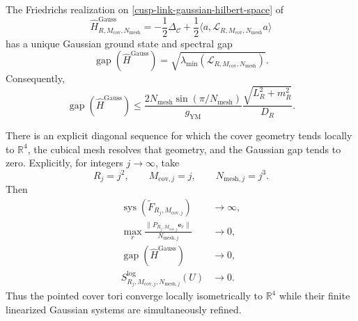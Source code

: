 \begin{theorem}
\label{cusp-link-gaussian-theorem}
The Friedrichs realization on \eqref{cusp-link-gaussian-hilbert-space} of
\begin{equation}
 \widehat H^{\mathrm{Gauss}}_{R,M_{\mathrm{cov}},N_{\mathrm{mesh}}}
 =-\frac12\Delta_{\mathscr C}
  +\frac12\langle a,
     \mathcal L_{R,M_{\mathrm{cov}},N_{\mathrm{mesh}}}a\rangle
 \label{cusp-link-gaussian-hamiltonian}
\end{equation}
has a unique Gaussian ground state and spectral gap
\begin{equation}
 \operatorname{gap}(\widehat H^{\mathrm{Gauss}})
 =\sqrt{\lambda_{\min}(
   \mathcal L_{R,M_{\mathrm{cov}},N_{\mathrm{mesh}}})}.
 \label{cusp-link-gaussian-gap}
\end{equation}
Consequently,
\begin{equation}
 \operatorname{gap}(\widehat H^{\mathrm{Gauss}})
 \leq
 \frac{2N_{\mathrm{mesh}}\sin(\pi/N_{\mathrm{mesh}})}{g_{\mathrm{YM}}}
 \frac{\sqrt{L_R^2+m_R^2}}{D_R}.
 \label{cusp-link-gaussian-gap-bound}
\end{equation}

There is an explicit diagonal sequence for which the cover geometry tends locally to
\(\mathbb R^4\), the cubical mesh resolves that geometry, and the Gaussian
gap tends to zero.  Explicitly, for integers \(j\to\infty\), take
\begin{equation}
 R_j=j^2,\qquad M_{\mathrm{cov},j}=j,\qquad
 N_{\mathrm{mesh},j}=j^3.
 \label{cusp-link-diagonal-sequence}
\end{equation}
Then
\begin{equation}
 \begin{aligned}
 \operatorname{sys}(\widetilde F_{R_j,M_{\mathrm{cov},j}})
 &\longrightarrow\infty,\\
 \max_r
 \frac{\lVert P_{R_j,M_{\mathrm{cov},j}}\mathbf e_r\rVert}
      {N_{\mathrm{mesh},j}}
 &\longrightarrow0,\\
 \operatorname{gap}(\widehat H^{\mathrm{Gauss}})
 &\longrightarrow0,\\
 S^{\log}_{R_j,M_{\mathrm{cov},j},N_{\mathrm{mesh},j}}(U)
 &\longrightarrow0.
 \end{aligned}
 \label{cusp-link-diagonal-conclusions}
\end{equation}
Thus the pointed cover tori converge locally isometrically to \(\mathbb R^4\)
while their finite linearized Gaussian systems are simultaneously refined.
\end{theorem}


